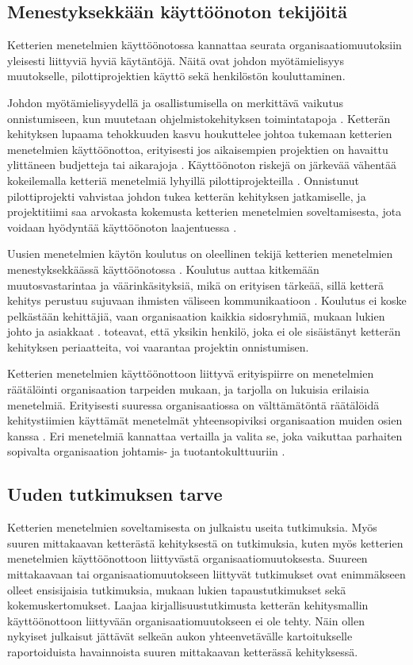 \subsection{Menestyksekkään käyttöönoton tekijöitä}

Ketterien menetelmien käyttöönotossa kannattaa seurata organisaatiomuutoksiin
yleisesti liittyviä hyviä käytäntöjä. Näitä ovat johdon myötämielisyys
muutokselle, pilottiprojektien käyttö sekä henkilöstön kouluttaminen.

Johdon myötämielisyydellä ja osallistumisella on merkittävä vaikutus
onnistumiseen, kun muutetaan ohjelmistokehityksen toimintatapoja
. Ketterän kehityksen lupaama tehokkuuden kasvu
houkuttelee johtoa tukemaan ketterien menetelmien käyttöönottoa, erityisesti jos
aikaisempien projektien on havaittu ylittäneen budjetteja tai aikarajoja
. Käyttöönoton riskejä on järkevää vähentää kokeilemalla
ketteriä menetelmiä lyhyillä pilottiprojekteilla .
Onnistunut pilottiprojekti vahvistaa johdon tukea ketterän kehityksen
jatkamiselle, ja projektitiimi saa arvokasta kokemusta ketterien menetelmien
soveltamisesta, jota voidaan hyödyntää käyttöönoton laajentuessa
.

Uusien menetelmien käytön koulutus on oleellinen tekijä ketterien menetelmien
menestyksekkäässä käyttöönotossa . Koulutus auttaa
kitkemään muutosvastarintaa ja väärinkäsityksiä, mikä on erityisen tärkeää,
sillä ketterä kehitys perustuu sujuvaan ihmisten väliseen kommunikaatioon
. Koulutus ei koske pelkästään kehittäjiä, vaan
organisaation kaikkia sidosryhmiä, mukaan lukien johto ja asiakkaat
.  toteavat, että yksikin henkilö, joka ei
ole sisäistänyt ketterän kehityksen periaatteita, voi vaarantaa projektin
onnistumisen.

Ketterien menetelmien käyttöönottoon liittyvä erityispiirre on menetelmien
räätälöinti organisaation tarpeiden mukaan, ja tarjolla on lukuisia erilaisia
menetelmiä. Erityisesti suuressa organisaatiossa on välttämätöntä räätälöidä
kehitystiimien käyttämät menetelmät yhteensopiviksi organisaation muiden osien
kanssa . Eri menetelmiä kannattaa vertailla ja valita se,
joka vaikuttaa parhaiten sopivalta organisaation johtamis- ja
tuotantokulttuuriin .

\subsection{Uuden tutkimuksen tarve}
Ketterien menetelmien soveltamisesta on julkaistu useita tutkimuksia. Myös
suuren mittakaavan ketterästä kehityksestä on tutkimuksia, kuten myös ketterien
menetelmien käyttöönottoon liittyvästä organisaatiomuutoksesta. Suureen
mittakaavaan tai organisaatiomuutokseen liittyvät tutkimukset ovat enimmäkseen
olleet ensisijaisia tutkimuksia, mukaan lukien tapaustutkimukset sekä
kokemuskertomukset. Laajaa kirjallisuustutkimusta ketterän kehitysmallin
käyttöönottoon liittyvään organisaatiomuutokseen ei ole tehty. Näin ollen
nykyiset julkaisut jättävät selkeän aukon yhteenvetävälle kartoitukselle
raportoiduista havainnoista suuren mittakaavan ketterässä kehityksessä.

